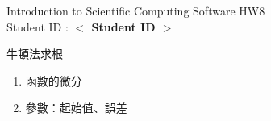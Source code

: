 \documentclass[12pt,a4paper]{article}
\newcommand{\placeholder}[1]{\textbf{$<$ #1 $>$}}
\newcommand{\idnumber}{\placeholder{Student ID}}
\begin{document}
\begin{CJK}{UTF8}{bsmi}
\begin{flushleft}Introduction to Scientific Computing Software HW8
\\Student ID : \idnumber{}\end{flushleft}

牛頓法求根
\begin{enumerate}
\item 函數的微分
\item 參數：起始值、誤差

\end{enumerate}
\end{CJK}
\end{document}
